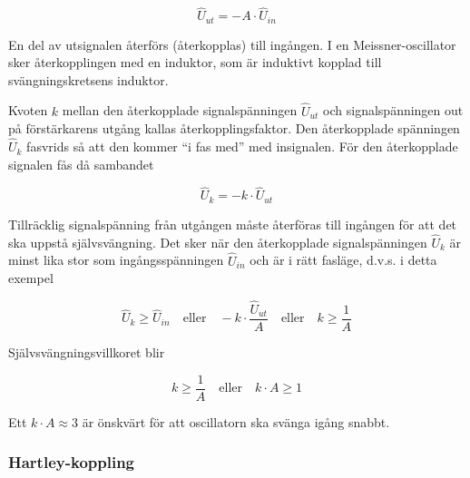 \[\hat{U}_{ut} = -A \cdot \hat{U}_{in}\]

En del av utsignalen återförs (återkopplas) till ingången. I en
Meissner-oscillator sker återkopplingen med en induktor, som är
induktivt kopplad till svängningskretsens induktor.

Kvoten \(k\) mellan den återkopplade signalspänningen \(\hat{U}_{ut}\) och
signalspänningen out på förstärkarens utgång kallas
återkopplingsfaktor. Den återkopplade spänningen \(\hat{U}_k\) fasvrids så
att den kommer ``i fas med'' med insignalen. För den återkopplade
signalen fås då sambandet

\[\hat{U}_k = -k \cdot \hat{U}_{ut}\]

Tillräcklig signalspänning från utgången måste återföras till ingången
för att det ska uppstå självsvängning. Det sker när den återkopplade
signalspänningen \(\hat{U}_k\) är minst lika stor som
ingångsspänningen \(\hat{U}_{in}\) och är i rätt fasläge, d.v.s. i
detta exempel

\[
\hat{U}_k \geq \hat{U}_{in}
\quad \text{eller} \quad
-k \cdot \frac{\hat{U}_{ut}}{A}
\quad \text{eller} \quad
k \geq \frac{1}{A}
\]

Självsvängningsvillkoret blir

\[
k \geq \frac{1}{A}
\quad \text{eller} \quad
k \cdot A \geq 1
\]

Ett \(k \cdot A \approx 3\) är önskvärt för att oscillatorn ska
svänga igång snabbt.

\subsubsection{Hartley-koppling}


